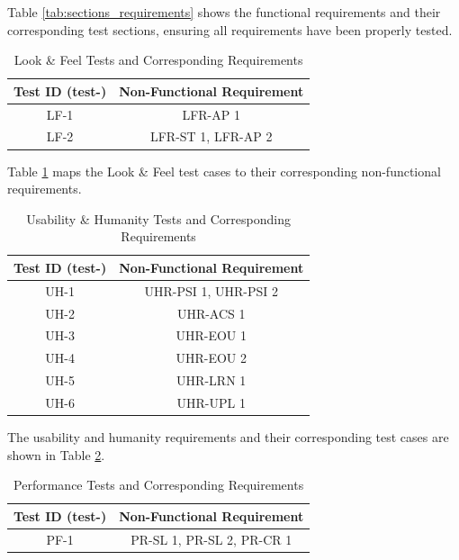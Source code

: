 \documentclass[12pt, titlepage]{article}
\begin{document}
Table \ref{tab:sections_requirements} shows the functional requirements and their corresponding test sections, ensuring all requirements have been properly tested.

  \begin{table}[H]
  \centering
  \caption{Look \& Feel Tests and Corresponding Requirements}
  \label{tab:nfr-trace-lf}
  \begin{tabular}{cc}
    \toprule \textbf{Test ID (test-)} & \textbf{Non-Functional Requirement} \\
    \midrule
    LF-1 & LFR-AP 1 \\
    LF-2 & LFR-ST 1, LFR-AP 2 \\
    \bottomrule
  \end{tabular}
\end{table}

Table \ref{tab:nfr-trace-lf} maps the Look & Feel test cases to their corresponding non-functional requirements.

  \begin{table}[H]
  \centering
  \caption{Usability \& Humanity Tests and Corresponding Requirements}
  \label{tab:nfr-trace-uh}
  \begin{tabular}{cc}
    \toprule \textbf{Test ID (test-)} & \textbf{Non-Functional Requirement} \\
    \midrule
    UH-1 & UHR-PSI 1, UHR-PSI 2 \\
    UH-2 & UHR-ACS 1 \\
    UH-3 & UHR-EOU 1 \\
    UH-4 & UHR-EOU 2 \\
    UH-5 & UHR-LRN 1 \\
    UH-6 & UHR-UPL 1 \\
    \bottomrule
  \end{tabular}
\end{table}

The usability and humanity requirements and their corresponding test cases are shown in Table \ref{tab:nfr-trace-uh}.

\begin{table}[H]
  \centering
  \caption{Performance Tests and Corresponding Requirements}
  \begin{tabular}{cc}
    \toprule \textbf{Test ID (test-)} & \textbf{Non-Functional Requirement} \\
    \midrule
    PF-1 & PR-SL 1, PR-SL 2, PR-CR 1 \\
    \bottomrule
  \end{tabular}
  \label{tab:nfr-trace-perf}
\end{table}
\end{document}
